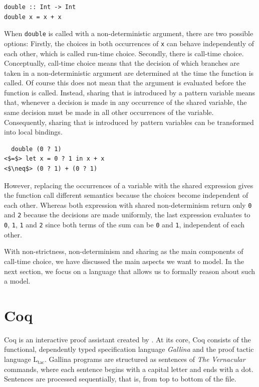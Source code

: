 \documentclass[a4paper, 11pt, fleqn, twoside, abstract=on]{scrreprt}
\newcommand{\hinl}[1]{\texttt{#1}}
\newcommand{\cinl}[1]{\texttt{#1}}
\begin{document}
\begin{verbatim}
double :: Int -> Int
double x = x + x
\end{verbatim}
\noindent
When \hinl{double} is called with a non-deterministic argument, there are two possible options: Firstly, the choices in both occurrences of \hinl{x} can behave independently of each other, which is called run-time choice.
Secondly, there is call-time choice.
Conceptually, call-time choice means that the decision of which branches are taken in a non-deterministic argument are determined at the time the function is called.
Of course this does not mean that the argument is evaluated before the function is called.
Instead, sharing that is introduced by a pattern variable means that, whenever a decision is made in any occurrence of the shared variable, the same decision must be made in all other occurrences of the variable.
Consequently, sharing that is introduced by pattern variables can be transformed into local bindings.

\begin{verbatim}
  double (0 ? 1) 
<$=$> let x = 0 ? 1 in x + x 
<$\neq$> (0 ? 1) + (0 ? 1)
\end{verbatim}
\noindent
However, replacing the occurrences of a variable with the shared expression gives the function call different semantics because the choices become independent of each other.
Whereas both expression with shared non-determinism return only \hinl{0} and \hinl{2} because the decisions are made uniformly, the last expression evaluates to \hinl{0}, \hinl{1}, \hinl{1} and \cinl{2} since both terms of the sum can be \hinl{0} and \cinl{1}, independent of each other.

With non-strictness, non-determinism and sharing as the main components of call-time choice, we have discussed the main aspects we want to model.
In the next section, we focus on a language that allows us to formally reason about such a model.

\section{Coq}
\label{sec:coqIntro}

Coq is an interactive proof assistant created by \citet{coq2019}.
At its core, Coq consists of the functional, dependently typed specification language \textit{Gallina} and the proof tactic language L$_\text{tac}$.
Gallina programs are structured as sentences of \textit{The Vernacular} commands, where each sentence begins with a capital letter and ends with a dot.
Sentences are processed sequentially, that is, from top to bottom of the file.
\end{document}

